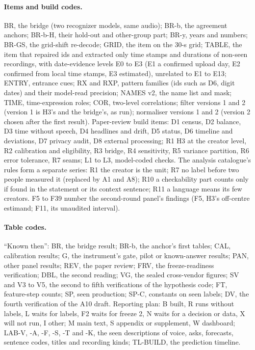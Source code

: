 \paragraph{Items and build codes.} BR, the bridge (two recognizer models, same audio); BR-b, the agreement anchors;
BR-b-H, their hold-out and other-group part; BR-y, years and numbers; BR-GS, the grid-shift re-decode; GRID, the item on
the 30-s grid; TABLE, the item that repaired ids and extracted only time stamps and durations of non-seen recordings,
with date-evidence levels E0 to E3 (E1 a confirmed upload day, E2 confirmed from local time stamps, E3 estimated),
unrelated to E1 to E13; ENTRY, entrance cues; RX and RXP, pattern families (ids such as D6, digit dates) and their
model-read precision; NAMES v2, the name list and mask; TIME, time-expression roles; COR, two-level correlations; filter
versions 1 and 2 (version 1 is H3's and the bridge's, as run); normaliser versions 1 and 2 (version 2 chosen after the
first result). Paper-review build items: D1 census, D2 balance, D3 time without speech, D4 headlines and drift, D5
status, D6 timeline and deviations, D7 privacy audit, D8 external processing; R1 H3 at the creator level, R2
calibration and eligibility, R3 bridge, R4 sensitivity, R5 variance partition, R6 error tolerance, R7 seams; L1 to L3,
model-coded checks. The analysis catalogue's rules form a separate series: R1 the creator is the unit; R7 no label
before two people measured it (replaced by A1 and A8); R10 a checkability part counts only if found in the statement or
its context sentence; R11 a language means its few creators. F5 to F39 number the second-round panel's findings (F5,
H3's off-centre estimand; F11, its unaudited interval).

\paragraph{Table codes.} ``Known then'': BR, the bridge result; BR-b, the anchor's first tables; CAL, calibration
results; G, the instrument's gate, pilot or known-answer results; PAN, other panel results; REV, the paper review; FRV,
the freeze-readiness verification; DBL, the second reading; VG, the sealed cross-vendor figures; SV and V3 to V5, the
second to fifth verifications of the hypothesis code; FT, feature-step counts; SP, seen production; SP-C, constants on
seen labels; DV, the fourth verification of the A10 draft. Reporting plan: B built, R runs without labels, L waits for
labels, F2 waits for freeze 2, N waits for a decision or data, X will not run, I other; M main text, S appendix or
supplement, W dashboard; LAB-V, -A, -F, -S, -T and -K, the seen descriptions of voice, asks, forecasts, sentence codes,
titles and recording kinds; TL-BUILD, the prediction timeline.


